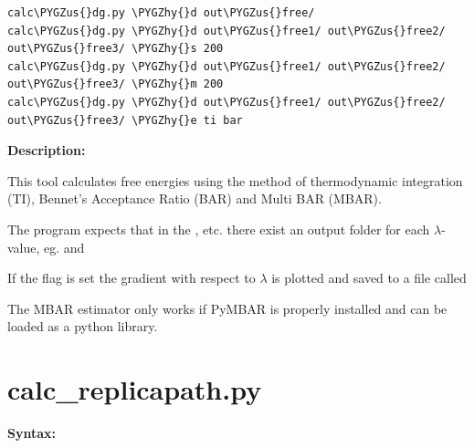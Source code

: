\documentclass[letterpaper,10pt,english]{sphinxmanual}
\def\PYGZus{\char`\_}
\def\PYGZhy{\char`\-}
\begin{document}
\begin{Verbatim}[commandchars=\\\{\}]
calc\PYGZus{}dg.py \PYGZhy{}d out\PYGZus{}free/
calc\PYGZus{}dg.py \PYGZhy{}d out\PYGZus{}free1/ out\PYGZus{}free2/ out\PYGZus{}free3/ \PYGZhy{}s 200
calc\PYGZus{}dg.py \PYGZhy{}d out\PYGZus{}free1/ out\PYGZus{}free2/ out\PYGZus{}free3/ \PYGZhy{}m 200
calc\PYGZus{}dg.py \PYGZhy{}d out\PYGZus{}free1/ out\PYGZus{}free2/ out\PYGZus{}free3/ \PYGZhy{}e ti bar
\end{Verbatim}

\textbf{Description:}

This tool calculates free energies using the method of thermodynamic integration (TI), Bennet's Acceptance Ratio (BAR) and Multi BAR (MBAR).

The program expects that in the ,  etc. there exist an output folder for each \(\lambda\)-value, eg.  and 

If the  flag is set the gradient with respect to \(\lambda\) is plotted and saved to a file called 

The MBAR estimator only works if PyMBAR is properly installed and can be loaded as a python library.


\section{calc\_replicapath.py}
\label{tools:calc-replicapath-py}
\textbf{Syntax:}
\end{document}
